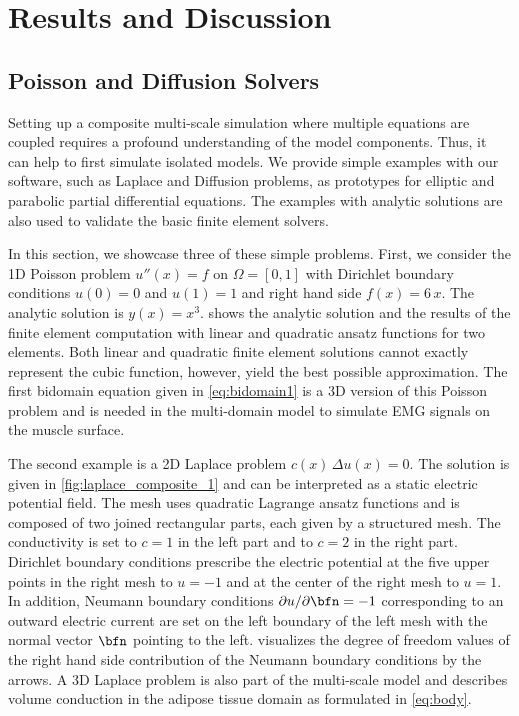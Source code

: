 \chapter{Results and Discussion}\label{sec:results}



\section{Poisson and Diffusion Solvers}

Setting up a composite multi-scale simulation where multiple equations are coupled requires a profound understanding of the model components. 
Thus, it can help to first simulate isolated models. We provide simple examples with our software, such as Laplace and Diffusion problems, as prototypes for elliptic and parabolic partial differential equations. The examples with analytic solutions are also used to validate the basic finite element solvers.

In this section, we showcase three of these simple problems. First, we consider the 1D Poisson problem $u''(x) = f$ on $\Omega=[0,1]$ with Dirichlet boundary conditions $u(0)=0$ and $u(1)=1$ and right hand side $f(x)=6\,x$. The analytic solution is $y(x)=x^3$.  shows the analytic solution and the results of the finite element computation with linear and quadratic ansatz functions for two elements. Both linear and quadratic finite element solutions cannot exactly represent the cubic function, however, yield the best possible approximation. 
The first bidomain equation given in \cref{eq:bidomain1} is a 3D version of this Poisson problem and is needed in the multi-domain model to simulate EMG signals on the muscle surface.

The second example is a 2D Laplace problem $c(x)\,\Delta u(x) = 0$. The solution is given in \cref{fig:laplace_composite_1} and can be interpreted as a static electric potential field. 
The mesh uses quadratic Lagrange ansatz functions and is composed of two joined rectangular parts, each given by a structured mesh. The conductivity is set to $c=1$ in the left part and to $c=2$ in the right part. Dirichlet boundary conditions prescribe the electric potential at the five upper points in the right mesh to $u = -1$ and at the center of the right mesh to $u=1$. In addition, Neumann boundary conditions $\partial u / \partial \bfn = -1$ corresponding to an outward electric current are set on the left boundary of the left mesh with the normal vector $\bfn$ pointing to the left.  visualizes the degree of freedom values of the right hand side contribution of the Neumann boundary conditions by the arrows. 
A 3D Laplace problem is also part of the multi-scale model and describes volume conduction in the adipose tissue domain as formulated in \cref{eq:body}.

